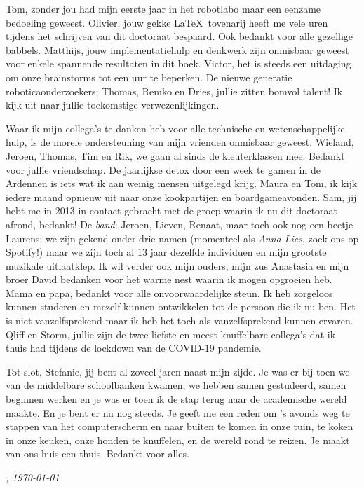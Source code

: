 \documentclass[\home/main.tex]{subfiles}
\begin{document}
Tom, zonder jou had mijn eerste jaar in het robotlabo maar een eenzame bedoeling geweest. Olivier, jouw gekke \LaTeX\ tovenarij heeft me vele uren tijdens het schrijven van dit doctoraat bespaard. Ook bedankt voor alle gezellige babbels.
Matthijs, jouw implementatiehulp en denkwerk zijn onmisbaar geweest voor enkele spannende resultaten in dit boek.
Victor, het is steeds een uitdaging om onze brainstorms tot een uur te beperken.
De nieuwe generatie roboticaonderzoekers; Thomas, Remko en Dries, jullie zitten bomvol talent! Ik kijk uit naar jullie toekomstige verwezenlijkingen.

Waar ik mijn collega's te danken heb voor alle technische en wetenschappelijke hulp, is de morele ondersteuning van mijn vrienden onmisbaar geweest.
Wieland, Jeroen, Thomas, Tim en Rik, we gaan al sinds de kleuterklassen mee. Bedankt voor jullie vriendschap. De jaarlijkse detox door een week te gamen in de Ardennen is iets wat ik aan weinig mensen uitgelegd krijg.
Maura en Tom, ik kijk iedere maand opnieuw uit naar onze kookpartijen en boardgameavonden.
Sam, jij hebt me in 2013 in contact gebracht met de groep waarin ik nu dit doctoraat afrond, bedankt!
De \textit{band}: Jeroen, Lieven, Renaat, maar toch ook nog een beetje Laurens; we zijn gekend onder drie namen (momenteel als \textit{Anna Lies}, zoek ons op Spotify!) maar we zijn toch al 13 jaar dezelfde individuen en mijn grootste muzikale uitlaatklep.
Ik wil verder ook mijn ouders, mijn zus Anastasia en mijn broer David bedanken voor het warme nest waarin ik mogen opgroeien heb. 
Mama en papa, bedankt voor alle onvoorwaardelijke steun. Ik heb zorgeloos kunnen studeren en mezelf kunnen ontwikkelen tot de persoon die ik nu ben. Het is niet vanzelfsprekend maar ik heb het toch als vanzelfsprekend kunnen ervaren.
Qliff en Storm, jullie zijn de twee liefste en meest knuffelbare collega's dat ik thuis had tijdens de lockdown van de COVID-19 pandemie.

Tot slot, Stefanie, jij bent al zoveel jaren naast mijn zijde. Je was er bij toen we van de middelbare schoolbanken kwamen, we hebben samen gestudeerd, samen beginnen werken en je was er toen ik de stap terug naar de academische wereld maakte. En je bent er nu nog steeds. 
Je geeft me een reden om 's avonds weg te stappen van het computerscherm en naar buiten te komen in onze tuin, te koken in onze keuken, onze honden te knuffelen, en de wereld rond te reizen. Je maakt van ons huis een thuis. Bedankt voor alles. 

\vspace{1cm}

\begin{flushright}
    \textit{\theauthor, \today}
\end{flushright}
\end{document}
